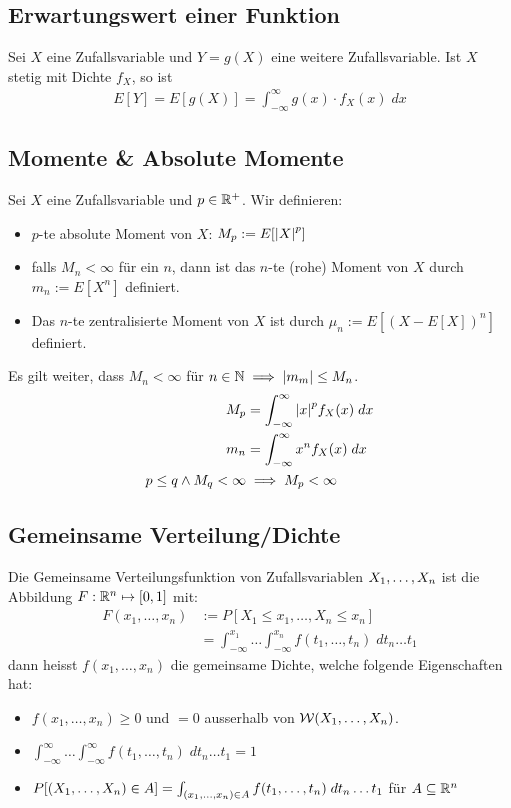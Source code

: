 \subsection{Erwartungswert einer Funktion}
Sei $X$ eine Zufallsvariable und $Y = g (X)$ eine weitere Zufallsvariable. Ist
$X$ stetig mit Dichte $f_X$, so ist
\begin{align*}
  E[Y] = E[g (X)] = \int_{-\infty}^\infty g (x) \cdot f_X (x) \; dx
\end{align*}
\subsection{Momente \& Absolute Momente}
Sei $X$ eine Zufallsvariable und $p \in \mathbb{R}^+$. Wir definieren:
\begin{itemize}
  \item $p$-te absolute Moment von $X$: $M_p := E[\abs{X}^p]$
  \item falls $M_n < \infty$ für ein $n$, dann ist das $n$-te (rohe) Moment von $X$
        durch $m_n := E[X^n]$ definiert.
  \item Das $n$-te zentralisierte Moment von $X$ ist durch $\mu_n := E[(X - E[X])^n]$
        definiert.
\end{itemize}
Es gilt weiter, dass $M_n < \infty$ für $n \in \mathbb{N} \implies \abs{m_m} \leq M_n$.
\begin{align*}
  M_p                         & = \int_{-\infty}^\infty \abs{x}^p f_X (x) \; dx \\
  m_n                         & = \int_{-\infty}^\infty x^n f_X (x) \; dx       \\
  p \leq q \land M_q < \infty & \implies M_p < \infty
\end{align*}
\subsection{Gemeinsame Verteilung/Dichte}
Die Gemeinsame Verteilungsfunktion von Zufallsvariablen $X_1, \dots, X_n$ ist die Abbildung $F: \mathbb{R}^n \mapsto [0, 1]$ mit:
\begin{align*}
  F (x_1, \dots, x_n) & := P[X_1 \leq x_1, \dots, X_n \leq x_n]                                                 \\
                      & = \int_{-\infty}^{x_1} \dots \int_{-\infty}^{x_n} f (t_1, \dots, t_n) \; dt_n \dots t_1
\end{align*}
dann heisst $f (x_1, \dots, x_n)$ die gemeinsame Dichte, welche folgende
Eigenschaften hat:
\begin{itemize}
  \item $f (x_1, \dots, x_n) \geq 0$ und $= 0$ ausserhalb von $\mathcal{W} (X_1, \dots, X_n)$.
  \item $\int_{-\infty}^\infty \dots \int_{-\infty}^\infty f (t_1, \dots, t_n) \; dt_n \dots t_1 = 1$
  \item $P[ (X_1, \dots, X_n) \in A] = \int_{ (x_1, \dots, x_n) \in A} f (t_1, \dots, t_n) \; dt_n \dots t_1$ für $A \subseteq \mathbb{R}^n$
\end{itemize}
